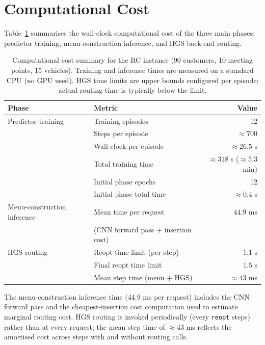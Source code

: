 
\section{Computational Cost}
\label{app:computational_cost}

Table~\ref{tab:computational_cost} summarises the wall-clock computational cost of the three main phases: predictor training, menu-construction inference, and HGS back-end routing.

\begin{table}[h]
\centering
\caption{Computational cost summary for the RC instance (90 customers, 10 meeting points, 15 vehicles). Training and inference times are measured on a standard CPU (no GPU used). HGS time limits are upper bounds configured per episode; actual routing time is typically below the limit.}
\label{tab:computational_cost}
\begin{tabular}{llr}
\hline
Phase & Metric & Value \\
\hline
Predictor training & Training episodes & 12 \\
                   & Steps per episode & ${\approx}700$ \\
                   & Wall-clock per episode & ${\approx}26.5$ s \\
                   & Total training time & ${\approx}318$ s ($\approx 5.3$ min) \\
                   & Initial phase epochs & 12 \\
                   & Initial phase total time & ${\approx}0.4$ s \\
\hline
Menu-construction inference & Mean time per request & $44.9$ ms \\
                            & (CNN forward pass + insertion cost) & \\
\hline
HGS routing & Reopt time limit (per step) & $1.1$ s \\
            & Final reopt time limit & $1.5$ s \\
            & Mean step time (menu + HGS) & ${\approx}43$ ms \\
\hline
\end{tabular}
\end{table}

The menu-construction inference time (44.9 ms per request) includes the CNN forward pass and the cheapest-insertion cost computation used to estimate marginal routing cost. HGS routing is invoked periodically (every \texttt{reopt} steps) rather than at every request; the mean step time of $\approx 43$ ms reflects the amortised cost across steps with and without routing calls.

